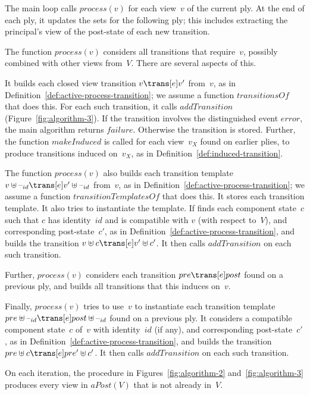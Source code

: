 The main loop calls $process(v)$ for each view~$v$ of the current ply.  At the
end of each ply, it updates the sets for the following ply; this includes
extracting the principal's view of the post-state of each new transition. 

The function $process(v)$ considers all transitions that require~$v$,
possibly combined with other views from~$V$.  There are several aspects of
this. 

It builds each closed view transition $v \trans[e] v'$ from~$v$, as in
Definition~\ref{def:active-process-transition}; we assume a function
$transitionsOf$ that does this.  For each such transition, it calls
$addTransition$ (Figure~\ref{fig:algorithm-3}).  If the transition involves
the distinguished event $error$, the main algorithm returns $failure$.
Otherwise the transition is stored.  Further, the function $makeInduced$ is
called for each view~$v_X$ found on earlier plies, to produce transitions
induced on~$v_X$, as in Definition~\ref{def:induced-transition}.

The function $process(v)$ also builds each transition template $v \uplus
\hole{id} \trans[e] v' \uplus \hole{id}$ from~$v$, as in
Definition~\ref{def:active-process-transition}; we assume a function
$transitionTemplatesOf$ that does this.  It stores each transition template.
It also tries to instantiate the template.  If finds each component state~$c$
such that $c$ has identity~$id$ and is compatible with $v$ (with respect
to~$V$), and corresponding post-state~$c'$, as in
Definition~\ref{def:active-process-transition}, and builds
the transition $v \uplus c \trans[e] v' \uplus c'$.  It then calls
$addTransition$ on each such transition.

Further, $process(v)$ considers each transition $pre \trans[e] post$ found on
a previous ply, and builds all transitions that this induces on~$v$.

Finally, $process(v)$ tries to use~$v$ to instantiate each transition template
$pre \uplus \hole{id} \trans[e] post \uplus \hole{id}$ found on a previous
ply.  It considers a compatible component state~$c$ of~$v$ with identity~$id$
(if any), and corresponding post-state~$c'$, as in
Definition~\ref{def:active-process-transition}, and builds the transition $pre
\uplus c \trans[e] pre' \uplus c'$.  It then calls $addTransition$ on each
such transition.


\begin{lemma}
On each iteration, the procedure in Figures~\ref{fig:algorithm-2}
and~\ref{fig:algorithm-3} produces every view in $aPost(V)$ that is not
already in~$V$.
\end{lemma}

